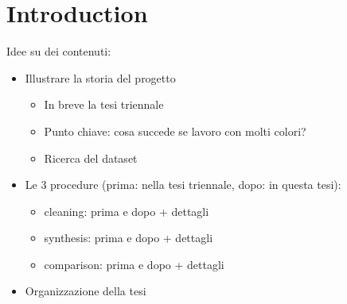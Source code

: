 \chapter{Introduction}
\begin{toDo}
	Idee su dei contenuti:
	\begin{itemize}
		\item Illustrare la storia del progetto
		\begin{itemize}
			\item In breve la tesi triennale
			\item Punto chiave: cosa succede se lavoro con molti colori?
			\item Ricerca del dataset
		\end{itemize}
		\item Le 3 procedure (prima: nella tesi triennale, dopo: in questa tesi):
		\begin{itemize}
			\item cleaning: prima e dopo + dettagli
			\item synthesis: prima e dopo + dettagli
			\item comparison: prima e dopo + dettagli
		\end{itemize}
		\item Organizzazione della tesi
	\end{itemize}
\end{toDo}
